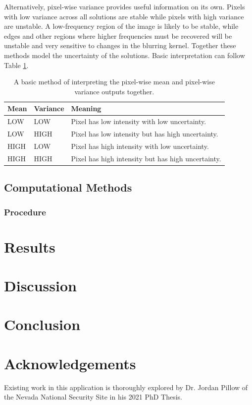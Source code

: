 \documentclass[letterpaper, 11pt, titlepage, twocolumn]{article}
\begin{document}
Alternatively, pixel-wise variance provides useful information on its own. Pixels with low variance across all solutions are stable while pixels with high variance are unstable. A low-frequency region of the image is likely to be stable, while edges and other regions where higher frequencies must be recovered will be unstable and very sensitive to changes in the blurring kernel. Together these methods model the uncertainty of the solutions. Basic interpretation can follow Table \ref{table:meanvar}.

\begin{table}
  \centering
  \begin{tabular}{|l|l|l|}
    \hline
    Mean & Variance & Meaning\\
    \hline\hline
    LOW & LOW & Pixel has low intensity with low uncertainty.\\\hline
    LOW & HIGH & Pixel has low intensity but has high uncertainty. \\\hline
    HIGH & LOW & Pixel has high intensity with low uncertainty. \\\hline
    HIGH & HIGH & Pixel has high intensity but has high uncertainty.\\\hline
  \end{tabular}
  \caption{A basic method of interpreting the pixel-wise mean and pixel-wise variance outputs together.}
  \label{table:meanvar}
\end{table}

\subsection{Computational Methods}

\subsubsection{Procedure}


\section{Results}


\section{Discussion}

\section{Conclusion}

\section{Acknowledgements}
Existing work in this application is thoroughly explored by Dr. Jordan Pillow of the Nevada National Security Site in his 2021 PhD Thesis. \cite{pillow_bayesian_2021} %

\printbibliography

\end{document}
